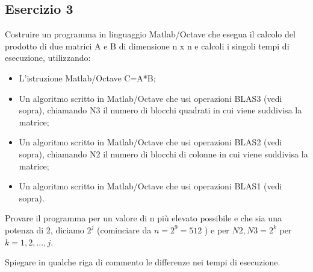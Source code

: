 \subsection{Esercizio 3}

Costruire un programma in linguaggio Matlab/Octave che esegua il calcolo del prodotto di due  matrici A e B di dimensione n x n e calcoli i singoli tempi di esecuzione, utilizzando:

\begin{itemize}

	\item L'istruzione Matlab/Octave C=A*B;
	\item Un algoritmo scritto in Matlab/Octave che usi operazioni BLAS3 (vedi sopra), chiamando N3 il numero di blocchi quadrati in cui viene suddivisa la matrice;
	\item Un algoritmo scritto in Matlab/Octave che usi operazioni BLAS2 (vedi sopra), chiamando N2 il numero di blocchi di colonne in cui viene suddivisa la matrice;
	\item Un algoritmo scritto in Matlab/Octave che usi operazioni BLAS1 (vedi sopra).

\end{itemize}

Provare il programma per un valore di n più elevato possibile e che sia una potenza di 2, diciamo $2^j$ (cominciare da $n = 2^9 = 512$ ) e per $N2,N3 = 2^k$ per $k=1,2,...,j$. 

Spiegare in qualche riga di commento le differenze nei tempi di esecuzione.

